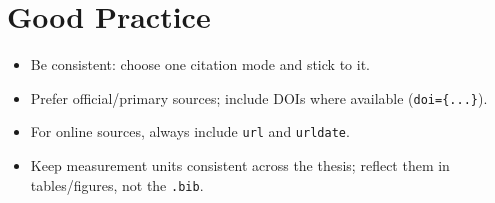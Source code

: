 \section{Good Practice}
\begin{itemize}
  \item Be consistent: choose one citation mode and stick to it.
  \item Prefer official/primary sources; include DOIs where available (\texttt{doi=\{...\}}).
  \item For online sources, always include \texttt{url} and \texttt{urldate}.
  \item Keep measurement units consistent across the thesis; reflect them in tables/figures, not the \texttt{.bib}.
\end{itemize}